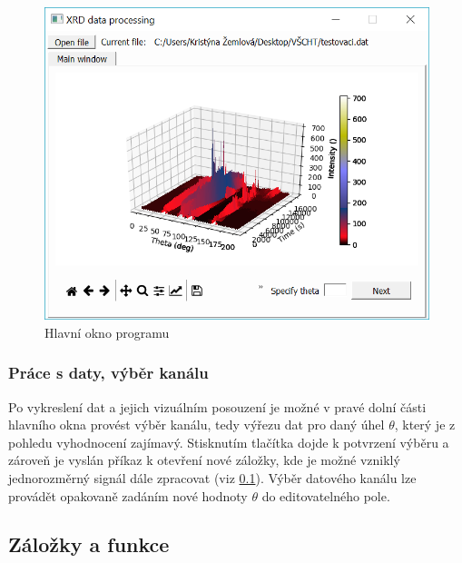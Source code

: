 \documentclass[a4paper, 12pt]{article}
\begin{document}
\begin{figure}[hbt!]
    \centering
    \includegraphics[width=\linewidth]{mainWin_grph.PNG}
    \caption{Hlavní okno programu}
    \label{fig:mainWin}
\end{figure}

\subsubsection{Práce s daty, výběr kanálu} \label{sec:channel}
Po vykreslení dat a jejich vizuálním posouzení je možné v pravé dolní části hlavního okna provést výběr kanálu, tedy výřezu dat pro daný úhel $\theta$, který je z pohledu vyhodnocení zajímavý. Stisknutím tlačítka  dojde k potvrzení výběru a zároveň je vyslán příkaz k otevření nové záložky, kde je možné vzniklý jednorozměrný signál dále zpracovat (viz \ref{sec:fcntabs}). Výběr datového kanálu lze provádět opakovaně zadáním nové hodnoty $\theta$ do editovatelného pole.

\subsection{Záložky a funkce} \label{sec:fcntabs}
\end{document}
